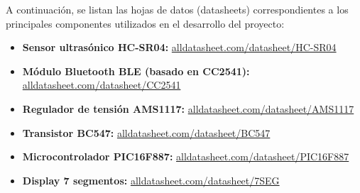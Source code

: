 \documentclass[]{article}
\begin{document}
	A continuación, se listan las hojas de datos (datasheets) correspondientes a los principales componentes utilizados en el desarrollo del proyecto:
	
	\begin{itemize}
		\item \textbf{Sensor ultrasónico HC-SR04:} \href{https://www.alldatasheet.com/datasheet-pdf/view/1132203/ETC2/HC-SR04.html}{alldatasheet.com/datasheet/HC-SR04}
		\item \textbf{Módulo Bluetooth BLE (basado en CC2541):} \href{https://www.alldatasheet.com/datasheet-pdf/view/454131/TI/CC2541.html}{alldatasheet.com/datasheet/CC2541}
		\item \textbf{Regulador de tensión AMS1117:} \href{https://www.alldatasheet.com/datasheet-pdf/view/49118/ADMOS/AMS1117.html}{alldatasheet.com/datasheet/AMS1117}
		\item \textbf{Transistor BC547:} \href{https://www.alldatasheet.com/datasheet-pdf/view/11551/ONSEMI/BC547.html}{alldatasheet.com/datasheet/BC547}
		\item \textbf{Microcontrolador PIC16F887:} \href{https://www.alldatasheet.com/datasheet-pdf/view/197543/MICROCHIP/PIC16F887.html}{alldatasheet.com/datasheet/PIC16F887}
		\item \textbf{Display 7 segmentos:}
		\href{https://www.alldatasheet.com/datasheet-pdf/view/819442/LIGHTKEY/LD5211AG.html}{alldatasheet.com/datasheet/7SEG}
	\end{itemize}
	
	
\end{document}
